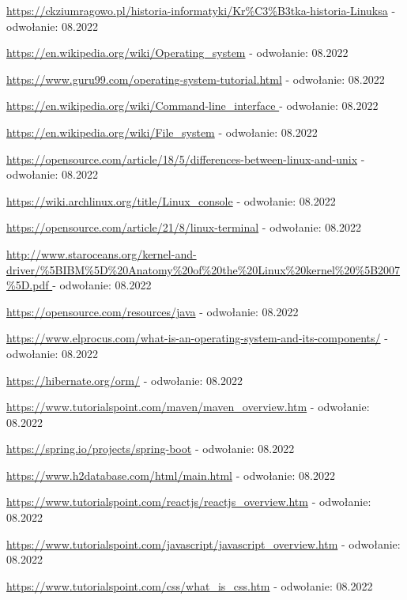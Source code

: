 \documentclass[10pt,a4paper]{report}
\begin{document}
\begin{adjustwidth}{2cm}{2cm}
\begin{thebibliography}{9}
\url{https://ckziumragowo.pl/historia-informatyki/Kr\%C3\%B3tka-historia-Linuksa} - odwołanie: 08.2022

\url{https://en.wikipedia.org/wiki/Operating\_system} - odwołanie: 08.2022

\url{https://www.guru99.com/operating-system-tutorial.html} - odwołanie: 08.2022

\url{https://en.wikipedia.org/wiki/Command-line\_interface } - odwołanie: 08.2022

\url{https://en.wikipedia.org/wiki/File\_system} - odwołanie: 08.2022

\url{https://opensource.com/article/18/5/differences-between-linux-and-unix} - odwołanie: 08.2022

\url{https://wiki.archlinux.org/title/Linux\_console} - odwołanie: 08.2022

\url{https://opensource.com/article/21/8/linux-terminal} - odwołanie: 08.2022

\url{http://www.staroceans.org/kernel-and-driver/\%5BIBM\%5D\%20Anatomy\%20of\%20the\%20Linux\%20kernel\%20\%5B2007\%5D.pdf } - odwołanie: 08.2022

\url{https://opensource.com/resources/java} - odwołanie: 08.2022

\url{https://www.elprocus.com/what-is-an-operating-system-and-its-components/} - odwołanie: 08.2022

\url{https://hibernate.org/orm/} - odwołanie: 08.2022

\url{https://www.tutorialspoint.com/maven/maven\_overview.htm} - odwołanie: 08.2022

\url{https://spring.io/projects/spring-boot} - odwołanie: 08.2022

\url{https://www.h2database.com/html/main.html} - odwołanie: 08.2022

\url{https://www.tutorialspoint.com/reactjs/reactjs\_overview.htm} - odwołanie: 08.2022

\url{https://www.tutorialspoint.com/javascript/javascript\_overview.htm} - odwołanie: 08.2022

\url{https://www.tutorialspoint.com/css/what\_is\_css.htm} - odwołanie: 08.2022

\end{thebibliography}
\listoffigures
{}
\lstlistoflistings        
\end{adjustwidth}
\end{document}
